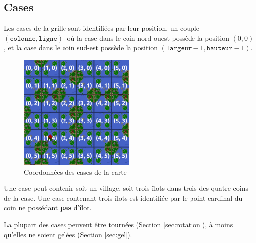\subsection{Cases}
Les cases de la grille sont identifiées par leur position, un couple
$(\mathtt{colonne}, \mathtt{ligne})$, où la case dans le coin nord-ouest
possède la position $(0, 0)$, et la case dans le coin sud-est possède
la position $(\mathtt{largeur} - 1, \mathtt{hauteur} - 1)$.

\begin{figure}[h]
    \centering
    \includegraphics[width=0.5\textwidth]{img/sprites/cases.png}
    \caption{Coordonnées des cases de la carte}
\end{figure}

Une case peut contenir soit un village, soit trois îlots dans trois des quatre
coins de la case.
Une case contenant trois îlots est identifiée par le point cardinal
du coin ne possédant \textbf{pas} d'îlot. %

La plupart des cases peuvent être tournées (Section \ref{sec:rotation}), à moins qu'elles ne soient gelées (Section \ref{sec:gel}).

